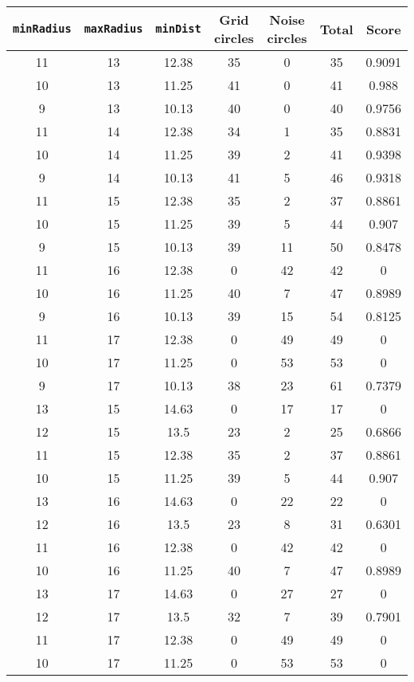 \documentclass[letterpaper, 12pt]{article}
\begin{document}
\begin{longtable}{|c|c|c|c|c|c|c|}
\hline
\textbf{\texttt{minRadius}} & \textbf{\texttt{maxRadius}} & \textbf{\texttt{minDist}} & \textbf{Grid circles} & \textbf{Noise circles} & \textbf{Total} & \textbf{Score} \\
\hline
11 & 13 & 12.38 & 35 & 0 & 35 & 0.9091 \\
\hline
10 & 13 & 11.25 & 41 & 0 & 41 & 0.988 \\
\hline
9 & 13 & 10.13 & 40 & 0 & 40 & 0.9756 \\
\hline
11 & 14 & 12.38 & 34 & 1 & 35 & 0.8831 \\
\hline
10 & 14 & 11.25 & 39 & 2 & 41 & 0.9398 \\
\hline
9 & 14 & 10.13 & 41 & 5 & 46 & 0.9318 \\
\hline
11 & 15 & 12.38 & 35 & 2 & 37 & 0.8861 \\
\hline
10 & 15 & 11.25 & 39 & 5 & 44 & 0.907 \\
\hline
9 & 15 & 10.13 & 39 & 11 & 50 & 0.8478 \\
\hline
11 & 16 & 12.38 & 0 & 42 & 42 & 0 \\
\hline
10 & 16 & 11.25 & 40 & 7 & 47 & 0.8989 \\
\hline
9 & 16 & 10.13 & 39 & 15 & 54 & 0.8125 \\
\hline
11 & 17 & 12.38 & 0 & 49 & 49 & 0 \\
\hline
10 & 17 & 11.25 & 0 & 53 & 53 & 0 \\
\hline
9 & 17 & 10.13 & 38 & 23 & 61 & 0.7379 \\
\hline
13 & 15 & 14.63 & 0 & 17 & 17 & 0 \\
\hline
12 & 15 & 13.5 & 23 & 2 & 25 & 0.6866 \\
\hline
11 & 15 & 12.38 & 35 & 2 & 37 & 0.8861 \\
\hline
10 & 15 & 11.25 & 39 & 5 & 44 & 0.907 \\
\hline
13 & 16 & 14.63 & 0 & 22 & 22 & 0 \\
\hline
12 & 16 & 13.5 & 23 & 8 & 31 & 0.6301 \\
\hline
11 & 16 & 12.38 & 0 & 42 & 42 & 0 \\
\hline
10 & 16 & 11.25 & 40 & 7 & 47 & 0.8989 \\
\hline
13 & 17 & 14.63 & 0 & 27 & 27 & 0 \\
\hline
12 & 17 & 13.5 & 32 & 7 & 39 & 0.7901 \\
\hline
11 & 17 & 12.38 & 0 & 49 & 49 & 0 \\
\hline
10 & 17 & 11.25 & 0 & 53 & 53 & 0 \\

\end{longtable}
\end{document}
